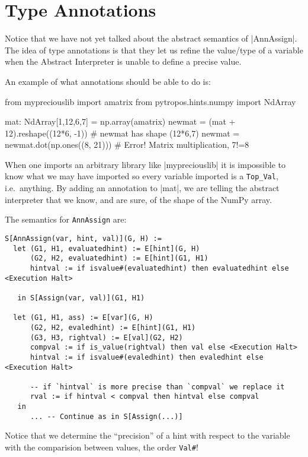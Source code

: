 \section{Type Annotations}

Notice that we have not yet talked about the abstract semantics of \pycode|AnnAssign|.
The idea of type annotations is that they let us refine the value/type of a variable when
the Abstract Interpreter is unable to define a precise value.

An example of what annotations should be able to do is:

\begin{pythoncode}
from mypreciouslib import amatrix
from pytropos.hints.numpy import NdArray

mat: NdArray[1,12,6,7] = np.array(amatrix)
newmat = (mat + 12).reshape((12*6, -1))  # newmat has shape (12*6,7)
newmat = newmat.dot(np.ones((8, 21)))  # Error! Matrix multiplication, 7!=8
\end{pythoncode}

When one imports an arbitrary library like \pycode|mypreciouslib| it is
impossible to know what we may have imported so every variable imported
is a \verb|Top_Val|, i.e.~anything. By adding an annotation to
\pycode|mat|, we are telling the abstract interpreter that we know, and
are sure, of the shape of the NumPy array.

The semantics for \texttt{AnnAssign} are:

\begin{verbatim}
S[AnnAssign(var, hint, val)](G, H) :=
  let (G1, H1, evaluatedhint) := E[hint](G, H)
      (G2, H2, evaluatedhint) := E[hint](G1, H1)
      hintval := if isvalue#(evaluatedhint) then evaluatedhint else <Execution Halt>

   in S[Assign(var, val)](G1, H1)

  let (G1, H1, ass) := E[var](G, H)
      (G2, H2, evaledhint) := E[hint](G1, H1)
      (G3, H3, rightval) := E[val](G2, H2)
      compval := if is_value(rightval) then val else <Execution Halt>
      hintval := if isvalue#(evaledhint) then evaledhint else <Execution Halt>

      -- if `hintval` is more precise than `compval` we replace it
      rval := if hintval < compval then hintval else compval
   in
      ... -- Continue as in S[Assign(...)]
\end{verbatim}

Notice that we determine the \enquote{precision} of a hint with respect to the variable
with the comparision between values, the order \verb|Val#|!
